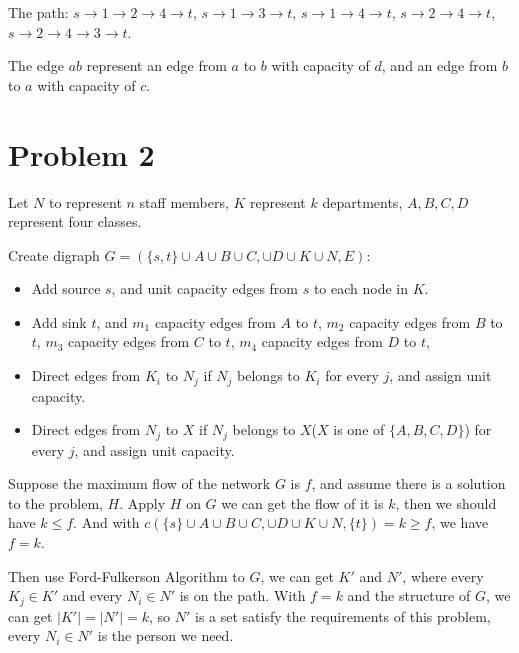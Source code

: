 \documentclass{article}
\begin{document}
The path: $s\rightarrow1\rightarrow2\rightarrow4\rightarrow t$,
$s\rightarrow1\rightarrow3\rightarrow t$,
$s\rightarrow1\rightarrow4\rightarrow t$,
$s\rightarrow2\rightarrow4\rightarrow t$,
$s\rightarrow2\rightarrow4\rightarrow3\rightarrow t$.

The edge $a$$b$ represent an edge from $a$ to $b$ with capacity of $d$, and an edge from $b$ to $a$ with capacity of $c$.

\pagebreak
\section*{Problem 2}
Let $N$ to represent $n$ staff members, $K$ represent $k$ departments, 
$A, B, C, D$ represent four classes.

Create digraph $G=(\{s, t\}\cup A\cup B\cup C,\cup D \cup K \cup N, E)$:
\begin{itemize}
    \item Add source $s$, and unit capacity edges from $s$ to each node in $K$.
    \item Add sink $t$, and $m_1$ capacity edges from $A$ to $t$, $m_2$ capacity edges from $B$ to $t$, $m_3$ capacity edges from $C$ to $t$, $m_4$ capacity edges from $D$ to $t$,
    \item Direct edges from $K_i$ to $N_j$ if $N_j$ belongs to $K_i$ for every $j$, and assign unit capacity.
    \item Direct edges from $N_j$ to $X$ if $N_j$ belongs to $X$($X$ is one of $\{A, B, C, D\}$) for every $j$, and assign unit capacity.
\end{itemize}

Suppose the maximum flow of the network $G$ is $f$, and assume there is a solution to the problem, $H$.
Apply $H$ on $G$ we can get the flow of it is $k$, then we should have $k\leqslant f$. And with $c(\{s\}\cup A\cup B\cup C,\cup D \cup K \cup N, \{t\})=k \geqslant f$, we have $f = k$.

Then use Ford-Fulkerson Algorithm to $G$, we can get $K'$ and  $N'$, 
where every $K_j\in K'$ and every $N_i\in N'$ is on the path.
With $f=k$ and the structure of $G$, we can get $|K'|=|N'|=k$, 
so $N'$ is a set satisfy the requirements of this problem,
every $N_i\in N'$ is the person we need.
\end{document}
